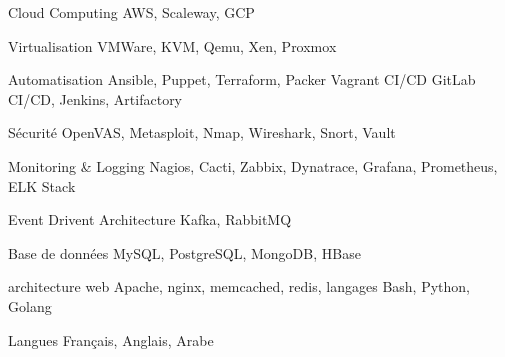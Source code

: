 

\begin{cvskills}


  \cvskill
    {Cloud Computing} %
    {AWS, Scaleway, GCP} %

  \cvskill
    {Virtualisation} %
    {VMWare, KVM, Qemu, Xen, Proxmox} %

\cvskill
    {Automatisation} %
    {Ansible, Puppet, Terraform, Packer Vagrant} %
\cvskill
    {CI/CD} %
    {GitLab CI/CD, Jenkins, Artifactory} %

  \cvskill
    {Sécurité} %
    {OpenVAS, Metasploit, Nmap, Wireshark, Snort, Vault} %

  \cvskill
    {Monitoring \& Logging} %
    {Nagios, Cacti, Zabbix, Dynatrace, Grafana, Prometheus, ELK Stack} %


\cvskill
    {Event Drivent Architecture} %
    {Kafka, RabbitMQ} %

  \cvskill
    {Base de données} %
    {MySQL, PostgreSQL, MongoDB, HBase} %

  \cvskill
    {architecture web}%
    {Apache, nginx, memcached, redis, } %
  \cvskill
    {langages} %
    {Bash, Python, Golang} %

  \cvskill
    {Langues} %
    {Français, Anglais, Arabe} %

\end{cvskills}
